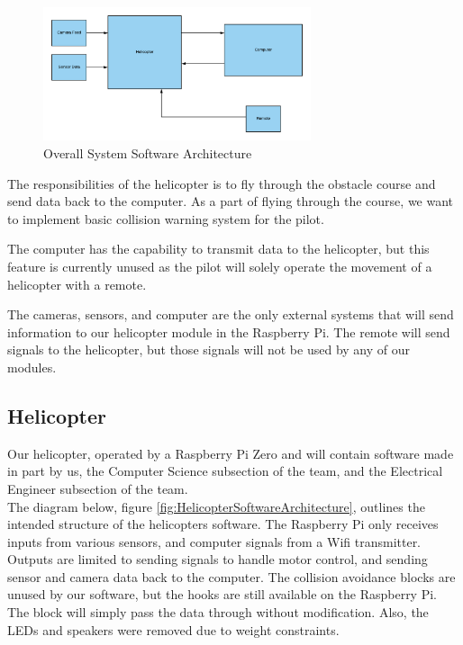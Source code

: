 \documentclass[onecolumn, oneside, letterpaper, draftclsnofoot, 10pt, compsoc]{IEEEtran}
\begin{document}
\begin{figure}[h]
    \centering
    \includegraphics[width=0.7\textwidth]{graphics/high_level_overall_arch.png}
    \caption{Overall System Software Architecture}
    \label{fig:OverallSystemArchitecture}
\end{figure}

\noindent \newline
The responsibilities of the helicopter is to fly through the obstacle course and send data back to the computer. As a part of flying through the course, we want to implement basic collision warning system for the pilot.

\noindent \newline
The computer has the capability to transmit data to the helicopter, but this feature is currently unused as the pilot will solely operate the movement of a helicopter with a remote.

\noindent \newline
The cameras, sensors, and computer are the only external systems that will send information to our helicopter module in the Raspberry Pi. The remote will send signals to the helicopter, but those signals will not be used by any of our modules.

\subsection{Helicopter}
Our helicopter, operated by a Raspberry Pi Zero and will contain software made in part by us, the Computer Science subsection of the team, and the Electrical Engineer subsection of the team. \\

\noindent \newline
The diagram below, figure \ref{fig:HelicopterSoftwareArchitecture}, outlines the intended structure of the helicopter\textquotesingle s software. The Raspberry Pi only receives inputs from various sensors, and computer signals from a Wifi transmitter. Outputs are limited to sending signals to handle motor control, and sending sensor and camera data back to the computer. The collision avoidance blocks are unused by our software, but the hooks are still available on the Raspberry Pi. The block will simply pass the data through without modification. Also, the LEDs and speakers were removed due to weight constraints.
\end{document}
